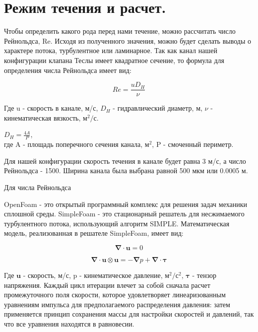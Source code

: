 \documentclass[14pt,a4paper]{article}
\begin{document}
    \section*{Режим течения и расчет.}        
        
        Чтобы определить какого рода перед нами течение, можно рассчитать число Рейнольдса, Re. Исходя из полученного значения, можно будет сделать выводы о характере потока, турбулентное или ламинарное.
        Так как канал нашей конфигурации клапана Теслы имеет квадратное сечение, то формула для определения числа Рейнольдса имеет вид:
        
        \begin{equation}\label{eqn:Re}
            Re = \frac{u D_{H}}{\nu}
        \end{equation}
            
        Где  u - скорость в канале, м/с, $ D_{H} $ - гидравлический диаметр, м, $\nu$ - кинематическая вязкость, м$^{2}/$с. 
        
        $D_{H} = \frac{4A}{P}$,\\
        где A - площадь поперечного сечения канала, м$^{2}$, P - смоченный периметр. 
        
        Для нашей конфигурации скорость течения в канале будет равна 3 м/с, а число Рейнольдса - 1500. Ширина канала была выбрана равной 500 мкм или 0.0005 м.  
        
        Для числа Рейнольдса    
        
        OpenFoam - это открытый программный комплекс для решения задач механики сплошной среды. SimpleFoam - это стационарный решатель для несжимаемого турбулентного потока, использующий алгоритм SIMPLE. Математическая модель, реализованная в решателе SimpleFoam, имеет вид:
        
        \begin{equation}\label{eqn:simpleFoam}
            \bm{\nabla} \cdot \bm{u} = 0
        \end{equation} 
        
        \begin{equation}\label{eqn:simpleFoam2}
            \bm{\nabla} \cdot \bm{u} \otimes \bm{u} = -\bm{\nabla} p + \bm{\nabla} \cdot \bm{\tau}
        \end{equation} 
        
        Где $\bm{u}$ - скорость, м/с, p - кинематическое давление, м$^{2}/$с$^{2}$, $\bm{\tau}$ - тензор напряжения. 
        Каждый цикл итерации влечет за собой сначала расчет промежуточного поля скорости, которое удовлетворяет линеаризованным уравнениям импульса для предполагаемого распределения давления: затем применяется принцип сохранения массы для настройки скоростей и давлений, так что все уравнения находятся в равновесии.
        
\end{document}
